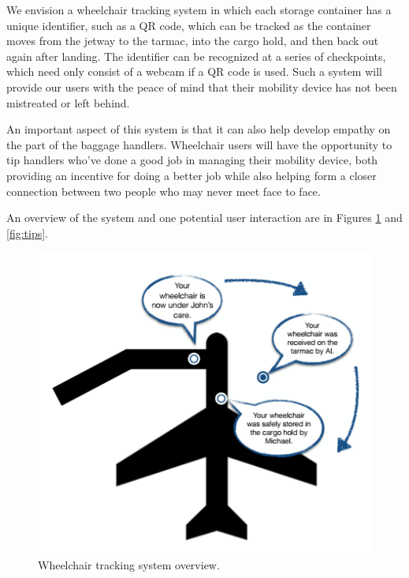 We envision a wheelchair tracking system in which each storage container has a unique identifier, such as a QR code, which can be tracked as the container moves from the jetway to the tarmac, into the cargo hold, and then back out again after landing. The identifier can be recognized at a series of checkpoints, which need only consist of a webcam if a QR code is used. Such a system will provide our users with the peace of mind that their mobility device has not been mistreated or left behind.

An important aspect of this system is that it can also help develop empathy on the part of the baggage handlers. Wheelchair users will have the opportunity to tip handlers who've done a good job in managing their mobility device, both providing an incentive for doing a better job while also helping form a closer connection between two people who may never meet face to face.

An overview of the system and one potential user interaction are in Figures \ref{fig:tracking} and \ref{fig:tips}.

\begin{figure}[h]
  \centering
     \includegraphics[width=12cm]{images/tracking.png}
   \caption{Wheelchair tracking system overview.}
  \label{fig:tracking}
\end{figure}

